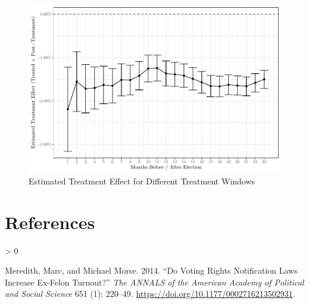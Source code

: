 \documentclass[
  12pt,
]{article}
\newlength{\cslhangindent}
\newenvironment{CSLReferences}[2] %
 {%
  \setlength{\parindent}{0pt}
  \ifodd #1 \everypar{\setlength{\hangindent}{\cslhangindent}}\ignorespaces\fi
  \ifnum #2 > 0
  \setlength{\parskip}{#2\baselineskip}
  \fi
 }%
 {}
\begin{document}
\begin{figure}[H]

{\centering \includegraphics{si_files/figure-latex/windows-1} 

}

\caption{\label{fig:rob-window}Estimated Treatment Effect for Different Treatment Windows}\label{fig:windows}
\end{figure}

\newpage

\hypertarget{references}{%
\section*{References}\label{references}}

\hypertarget{refs}{}
\begin{CSLReferences}{1}{0}
\leavevmode\hypertarget{ref-Meredith2014}{}%
Meredith, Marc, and Michael Morse. 2014. {``Do {Voting Rights Notification Laws Increase Ex}-{Felon Turnout}?''} \emph{The ANNALS of the American Academy of Political and Social Science} 651 (1): 220--49. \url{https://doi.org/10.1177/0002716213502931}.

\end{CSLReferences}
\end{document}
